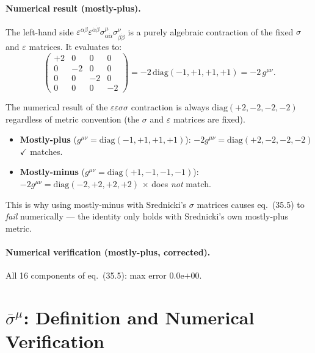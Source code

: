 \documentclass[12pt]{article}
\newcommand{\verified}[1]{\textcolor{verifygreen}{\checkmark\; #1}}
\begin{document}
\paragraph{Numerical result (mostly-plus).}

The left-hand side $\varepsilon^{\alpha\beta}\varepsilon^{\dot\alpha\dot\beta}
\sigma^\mu_{\alpha\dot\alpha}\sigma^\nu_{\beta\dot\beta}$ is a purely
algebraic contraction of the fixed $\sigma$ and $\varepsilon$ matrices.
It evaluates to:
\[
  \begin{pmatrix}
    +2 & 0 & 0 & 0 \\
    0 & -2 & 0 & 0 \\
    0 & 0 & -2 & 0 \\
    0 & 0 & 0 & -2
  \end{pmatrix}
  = -2\,\mathrm{diag}(-1,+1,+1,+1) = -2\,g^{\mu\nu}.
\]

\begin{metricnote}
The numerical result of the $\varepsilon\varepsilon\sigma\sigma$ contraction
is always $\mathrm{diag}(+2,-2,-2,-2)$ regardless of metric convention
(the $\sigma$ and $\varepsilon$ matrices are fixed).
\begin{itemize}
  \item \textbf{Mostly-plus} ($g^{\mu\nu}=\mathrm{diag}(-1,+1,+1,+1)$):\;
        $-2g^{\mu\nu} = \mathrm{diag}(+2,-2,-2,-2)$ $\checkmark$ matches.
  \item \textbf{Mostly-minus} ($g^{\mu\nu}=\mathrm{diag}(+1,-1,-1,-1)$):\;
        $-2g^{\mu\nu} = \mathrm{diag}(-2,+2,+2,+2)$ $\times$ does \emph{not} match.
\end{itemize}
This is why using mostly-minus with Srednicki's $\sigma$ matrices causes
eq.~(35.5) to \emph{fail} numerically --- the identity only holds with
Srednicki's own mostly-plus metric.
\end{metricnote}

\paragraph{Numerical verification (mostly-plus, corrected).}
\verified{All 16 components of eq.~(35.5): max error $0.0$\textrm{e}$+00$.}

\section{\texorpdfstring{$\bar\sigma^\mu$}{sigmabar\^{}mu}:
         Definition and Numerical Verification \quad [eq.~35.19--35.20]}
\end{document}
